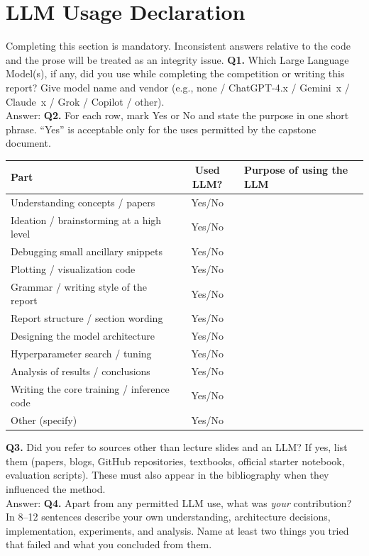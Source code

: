 \documentclass[11pt, oneside]{article}
\begin{document}
\section*{LLM Usage Declaration}
Completing this section is mandatory. Inconsistent answers relative to the code and the prose will be treated as an integrity issue.
\medskip
\noindent
\textbf{Q1.} Which Large Language Model(s), if any, did you use while completing the competition or writing this report? Give model name and vendor (e.g., none / ChatGPT-4.x / Gemini~x / Claude~x / Grok / Copilot / other). \\[0.6em]
Answer: \underline{\hspace{0.88\textwidth}}
\medskip
\noindent
\textbf{Q2.} For each row, mark Yes or No and state the purpose in one short phrase. ``Yes'' is acceptable only for the uses permitted by the capstone document.
\begin{table}[H]
\centering
\begin{tabular}{>{\raggedright\arraybackslash}p{4.6cm}|c|>{\raggedright\arraybackslash}p{7.2cm}}
\toprule
Part & Used LLM? & Purpose of using the LLM \\
\midrule
Understanding concepts / papers & Yes/No &  \\
Ideation / brainstorming at a high level & Yes/No &  \\
Debugging small ancillary snippets & Yes/No &  \\
Plotting / visualization code & Yes/No &  \\
Grammar / writing style of the report & Yes/No &  \\
Report structure / section wording & Yes/No &  \\
Designing the model architecture & Yes/No & \\
Hyperparameter search / tuning & Yes/No &  \\
Analysis of results / conclusions & Yes/No & \\
Writing the core training / inference code & Yes/No &  \\
Other (specify) & Yes/No &  \\
\bottomrule
\end{tabular}
\end{table}
\medskip
\noindent
\textbf{Q3.} Did you refer to sources other than lecture slides and an LLM?
If yes, list them (papers, blogs, GitHub repositories, textbooks, official starter notebook, evaluation scripts). These must also appear in the bibliography when they influenced the method. \\[0.4em]
Answer:
\medskip
\noindent
\textbf{Q4.} Apart from any permitted LLM use, what was \emph{your} contribution? In 8--12 sentences describe your own understanding, architecture decisions, implementation, experiments, and analysis. Name at least two things you tried that failed and what you concluded from them.
\medskip
\noindent
\vspace{1.4cm}


\end{document}
